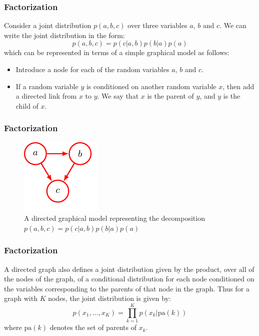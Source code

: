 \documentclass{beamer}
\begin{document}
\begin{frame}
    \frametitle{Factorization}
    Consider a joint distribution $p(a,b,c)$ over three variables $a$, $b$ and $c$. We can write the joint distribution in the form:
    \begin{equation*}
        p(a,b,c)=p(c|a,b)p(b|a)p(a)
    \end{equation*}
    which can be represented in terms of a simple graphical model as follows:
    \begin{itemize}
        \item Introduce a node for each of the random variables $a$, $b$ and $c$.
        \item If a random variable $y$ is conditioned on another random variable $x$, then add a directed link from $x$ to $y$. We say that $x$ is the parent of $y$, and $y$ is the child of $x$.
    \end{itemize}
\end{frame}

\begin{frame}
    \frametitle{Factorization}
    \begin{figure}
        \caption{A directed graphical model representing the decomposition $p(a,b,c)=p(c|a,b)p(b|a)p(a)$}
        \includegraphics{Figure_1.pdf}
    \end{figure}
\end{frame}

\begin{frame}
    \frametitle{Factorization}
    A directed graph also defines a joint distribution given by the product, over all of the nodes of the graph, of a conditional distribution for each node conditioned on the variables corresponding to the parents of that node in the graph. Thus for a graph with $K$ nodes, the joint distribution is given by:
    \begin{equation*}
        p(x_{1},\hdots,x_{K})=\prod_{k=1}^{K}p(x_{k}|\mathrm{pa}(k))
    \end{equation*}
    where $\mathrm{pa}(k)$ denotes the set of parents of $x_{k}$.
\end{frame}
\end{document}
